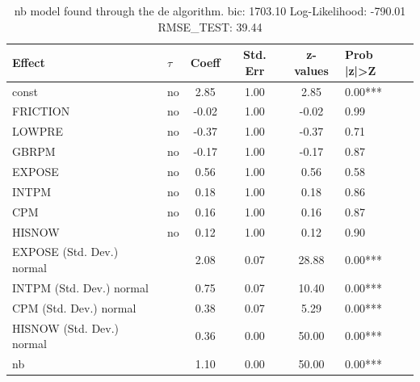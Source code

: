 \begin{table}
	\caption{nb model found through the de algorithm. bic: 1703.10 Log-Likelihood: -790.01 RMSE_TEST: 39.44}
	\begin{center}
		\begin{tabular}{|l|l|c|c|c|l|}
			\hline
			Effect & $\tau$ & Coeff & Std. Err & z-values & Prob |z|>Z \\
			\hline
			const & no & 2.85 & 1.00 & 2.85 & 0.00*** \\
			\hline
			FRICTION & no & -0.02 & 1.00 & -0.02 & 0.99 \\
			\hline
			LOWPRE & no & -0.37 & 1.00 & -0.37 & 0.71 \\
			\hline
			GBRPM & no & -0.17 & 1.00 & -0.17 & 0.87 \\
			\hline
			EXPOSE & no & 0.56 & 1.00 & 0.56 & 0.58 \\
			\hline
			INTPM & no & 0.18 & 1.00 & 0.18 & 0.86 \\
			\hline
			CPM & no & 0.16 & 1.00 & 0.16 & 0.87 \\
			\hline
			HISNOW & no & 0.12 & 1.00 & 0.12 & 0.90 \\
			\hline
			EXPOSE (Std. Dev.) normal &  & 2.08 & 0.07 & 28.88 & 0.00*** \\
			\hline
			INTPM (Std. Dev.) normal &  & 0.75 & 0.07 & 10.40 & 0.00*** \\
			\hline
			CPM (Std. Dev.) normal &  & 0.38 & 0.07 & 5.29 & 0.00*** \\
			\hline
			HISNOW (Std. Dev.) normal &  & 0.36 & 0.00 & 50.00 & 0.00*** \\
			\hline
			nb &  & 1.10 & 0.00 & 50.00 & 0.00*** \\
			\hline
		\end{tabular}
	\end{center}
\end{table}